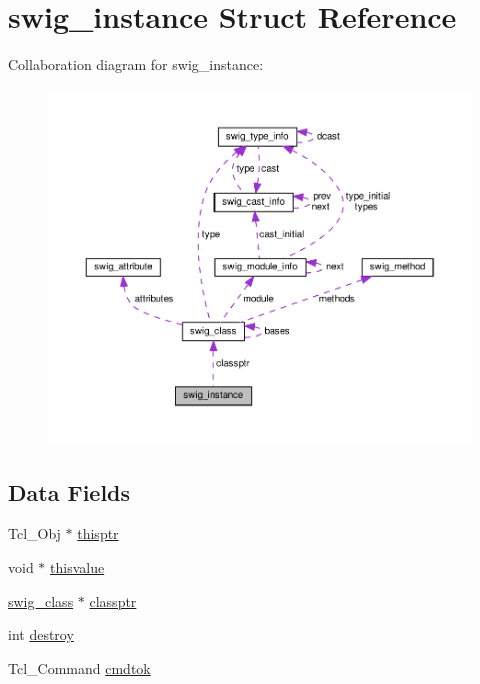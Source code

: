 \hypertarget{structswig__instance}{}\section{swig\+\_\+instance Struct Reference}
\label{structswig__instance}


Collaboration diagram for swig\+\_\+instance\+:\nopagebreak
\begin{figure}[H]
\begin{center}
\leavevmode
\includegraphics[width=350pt]{structswig__instance__coll__graph}
\end{center}
\end{figure}
\subsection*{Data Fields}
\begin{DoxyCompactItemize}
\item 
Tcl\+\_\+\+Obj $\ast$ \hyperlink{structswig__instance_ad53df21eb34277cc516a5011451a5762}{thisptr}
\item 
void $\ast$ \hyperlink{structswig__instance_a896fc81e257c64aae217eb80543f1632}{thisvalue}
\item 
\hyperlink{structswig__class}{swig\+\_\+class} $\ast$ \hyperlink{structswig__instance_a3ac823647cceb84f1fc42aa0b2b95f53}{classptr}
\item 
int \hyperlink{structswig__instance_a3bdcd16ae587f72dd6e29e52745e279a}{destroy}
\item 
Tcl\+\_\+\+Command \hyperlink{structswig__instance_a922b8e6fb63293c195d7de91086d0cad}{cmdtok}
\end{DoxyCompactItemize}


